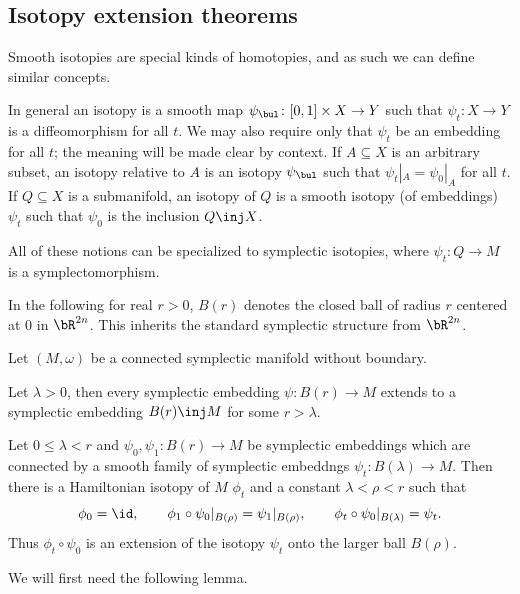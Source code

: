 \subsection{Isotopy extension theorems}

Smooth isotopies are special kinds of homotopies, and as such we can define similar concepts.

\bdefn

    In general an isotopy is a smooth map $\psi_\bul\colon[0,1]\times X\to Y$ such that $\psi_t\colon X\to Y$ is a diffeomorphism for all $t$.
    We may also require only that $\psi_t$ be an embedding for all $t$; the meaning will be made clear by context.
    If $A\subseteq X$ is an arbitrary subset, an {\emphcolor isotopy relative to $A$} is an isotopy $\psi_\bul$ such that $\psi_t|_A=\psi_0|_A$ for all $t$.
    If $Q\subseteq X$ is a submanifold, an {\emphcolor isotopy of $Q$} is a smooth isotopy (of embeddings) $\psi_t$ such that $\psi_0$ is the inclusion $Q\inj X$.

    All of these notions can be specialized to {\emphcolor symplectic isotopies}, where $\psi_t\colon Q\to M$ is a symplectomorphism.

\edefn

In the following for real $r>0$, $B(r)$ denotes the closed ball of radius $r$ centered at $0$ in $\bR^{2n}$.
This inherits the standard symplectic structure from $\bR^{2n}$.

\bthrm[name={sympballext}]

    Let $(M,\omega)$ be a connected symplectic manifold without boundary.
    \benum
        \item Let $\lambda>0$, then every symplectic embedding $\psi\colon B(r)\to M$ extends to a symplectic embedding $B(r)\inj M$ for some $r>\lambda$.
        \item Let $0\leq\lambda<r$ and $\psi_0,\psi_1\colon B(r)\to M$ be symplectic embeddings which are connected by a smooth family of
        symplectic embeddngs $\psi_t\colon B(\lambda)\to M$.
        Then there is a Hamiltonian isotopy of $M$ $\phi_t$ and a constant $\lambda<\rho<r$ such that
        $$ \phi_0 = \id,\qquad \phi_1\circ\psi_0|_{B(\rho)} = \psi_1|_{B(\rho)},\qquad \phi_t\circ\psi_0|_{B(\lambda)} = \psi_t . $$
        Thus $\phi_t\circ\psi_0$ is an extension of the isotopy $\psi_t$ onto the larger ball $B(\rho)$.
    \eenum

\ethrm

We will first need the following lemma.

\blemm

